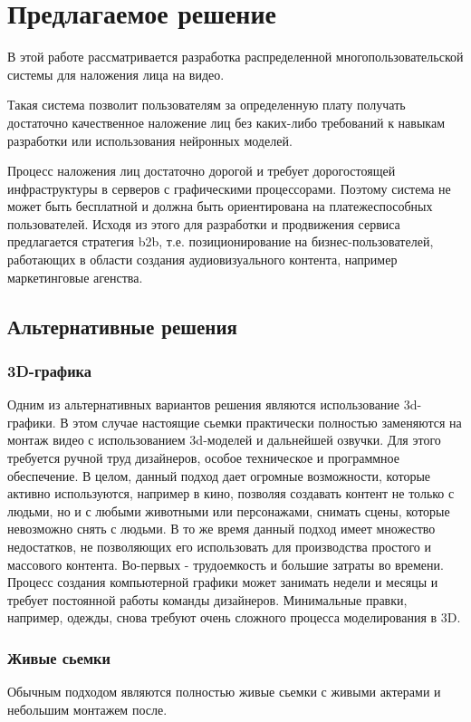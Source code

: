 \section{Предлагаемое решение}

В этой работе рассматривается разработка распределенной многопользовательской системы для наложения лица на видео.

Такая система позволит пользователям за определенную плату получать достаточно качественное наложение лиц без каких-либо требований к навыкам разработки или использования нейронных моделей. 

Процесс наложения лиц достаточно дорогой и требует дорогостоящей инфраструктуры в серверов с графическими процессорами. Поэтому система не может быть бесплатной и должна быть ориентирована на платежеспособных пользователей. Исходя из этого для разработки и продвижения сервиса предлагается стратегия b2b, т.е. позиционирование на бизнес-пользователей, работающих в области создания аудиовизуального контента, например маркетинговые агенства.

\subsection{Альтернативные решения}


\subsubsection*{3D-графика}

Одним из альтернативных вариантов решения являются использование 3d-графики. В этом случае настоящие сьемки практически полностью заменяются на монтаж видео с использованием 3d-моделей и дальнейшей озвучки.
Для этого требуется ручной труд дизайнеров, особое техническое и программное обеспечение.
В целом, данный подход дает огромные возможности, которые активно используются, например в кино, позволяя создавать контент не только с людьми, но и с любыми животными или персонажами, снимать сцены, которые невозможно снять с людьми.
В то же время данный подход имеет множество недостатков, не позволяющих его использовать для производства простого и массового контента. Во-первых - трудоемкость и большие затраты во времени. Процесс создания компьютерной графики может занимать недели и месяцы и требует постоянной работы команды дизайнеров. Минимальные правки, например, одежды, снова требуют очень сложного процесса моделирования в 3D.

\subsubsection*{Живые сьемки}

Обычным подходом являются полностью живые сьемки с живыми актерами и небольшим монтажем после. 